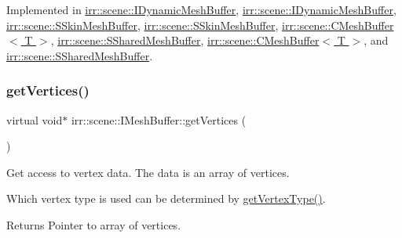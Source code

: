 Implemented in \hyperlink{classirr_1_1scene_1_1IDynamicMeshBuffer_a433e0e8ec301ce898dc373ca65e30e85}{irr\+::scene\+::\+I\+Dynamic\+Mesh\+Buffer}, \hyperlink{classirr_1_1scene_1_1IDynamicMeshBuffer_a433e0e8ec301ce898dc373ca65e30e85}{irr\+::scene\+::\+I\+Dynamic\+Mesh\+Buffer}, \hyperlink{structirr_1_1scene_1_1SSkinMeshBuffer_a61271053674a773fd4afcdffafddf9b3}{irr\+::scene\+::\+S\+Skin\+Mesh\+Buffer}, \hyperlink{structirr_1_1scene_1_1SSkinMeshBuffer_a61271053674a773fd4afcdffafddf9b3}{irr\+::scene\+::\+S\+Skin\+Mesh\+Buffer}, \hyperlink{classirr_1_1scene_1_1CMeshBuffer_ad9463b97ee94bbc26bbb11bf867ea830}{irr\+::scene\+::\+C\+Mesh\+Buffer$<$ T $>$}, \hyperlink{structirr_1_1scene_1_1SSharedMeshBuffer_a564b81fd7498e6df3c912e1a7dec21de}{irr\+::scene\+::\+S\+Shared\+Mesh\+Buffer}, \hyperlink{classirr_1_1scene_1_1CMeshBuffer_ad9463b97ee94bbc26bbb11bf867ea830}{irr\+::scene\+::\+C\+Mesh\+Buffer$<$ T $>$}, and \hyperlink{structirr_1_1scene_1_1SSharedMeshBuffer_a564b81fd7498e6df3c912e1a7dec21de}{irr\+::scene\+::\+S\+Shared\+Mesh\+Buffer}.

\mbox{\label{classirr_1_1scene_1_1IMeshBuffer_ac1695efc198b05a086487606bc2783e7}} 
\subsubsection{\texorpdfstring{get\+Vertices()}{getVertices()}\hspace{0.1cm}{\footnotesize\ttfamily [3/4]}}
{\footnotesize\ttfamily virtual void$\ast$ irr\+::scene\+::\+I\+Mesh\+Buffer\+::get\+Vertices (\begin{DoxyParamCaption}{ }\end{DoxyParamCaption})\hspace{0.3cm}{\ttfamily [pure virtual]}}



Get access to vertex data. The data is an array of vertices. 

Which vertex type is used can be determined by \hyperlink{classirr_1_1scene_1_1IMeshBuffer_a4d7a84ae4416487736f0ed0f519bb4f0}{get\+Vertex\+Type()}. \begin{DoxyReturn}{Returns}
Pointer to array of vertices. 
\end{DoxyReturn}


